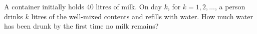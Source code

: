 A container initially holds 40 litres of milk. On day $k$, for $k=1,2,\ldots$, a person drinks $k$ litres of the well-mixed contents and refills with water. How much water has been drunk by the first time no milk remains?
